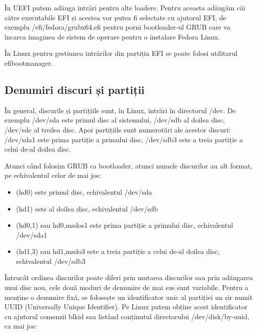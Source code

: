 În UEFI putem adăuga intrări pentru alte loadere. Pentru aceasta adăugăm căi
către executabile EFI și acestea vor putea fi selectate cu ajutorul EFI, de
exemplu /efi/fedora/grubx64.efi pentru porni bootloader-ul GRUB care va încarca
imaginea de sistem de operare pentru o instalare Fedora Linux.

În Linux pentru gestiunea intrărilor din partiția EFI se poate folosi utilitarul
efibootmanager.

\subsection{Denumiri discuri și partiții}
\label{sec:boot-bootdev-denumiri}

În general, discurile și partițiile sunt, în Linux, intrări în directorul /dev.
De exemplu /dev/sda este primul disc al sistemului, /dev/sdb al doilea disc,
/dev/sdc al treilea disc. Apoi partițiile sunt numerotări ale acestor discuri:
/dev/sda1 este prima partiție a primului disc, /dev/sdb3 este a treia partiție a
celui de-al doilea disc.

Atunci când folosim GRUB ca bootloader, atunci numele discurilor au alt format,
pe echivalentul celor de mai jos:

\begin{itemize}
	\item (hd0) este primul disc, echivalentul /dev/sda
	\item (hd1) este al doilea disc, echivalentul /dev/sdb
	\item (hd0,1) sau hd0,msdos1 este prima partiție a primului disc,
		echivalentul /dev/sda1
	\item (hd1,3) sau hd1,msdo3 este a treia partiție a celui de-al doilea
		disc, echivalentul /dev/sdb3
\end{itemize}

Întrucât ordinea discurilor poate diferi prin mutarea discurilor sau prin
adăugarea unui disc nou, cele două moduri de denumire de mai sus sunt variabile.
Pentru a menține o denumire fixă, se folosește un identificator unic al
partiției un șir numit UUID (Universally Unique Identifier). Pe Linux putem
obține acest identificator cu ajutorul comenzii blkid sau listând conținutul
directorului /dev/disk/by-uuid, ca mai jos:



